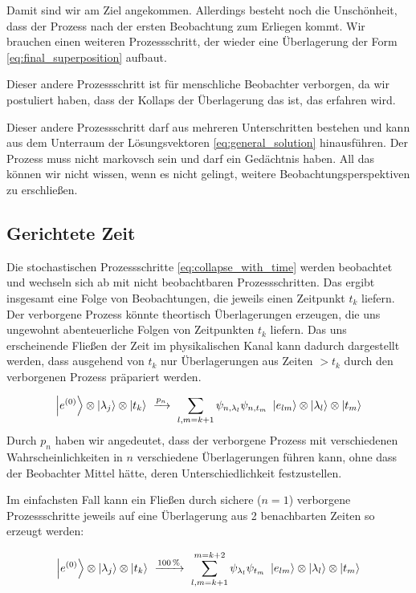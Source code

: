 \documentclass[12pt]{article}
\begin{document}
Damit sind wir am Ziel angekommen. Allerdings besteht noch die Unschönheit, dass der Prozess nach der ersten Beobachtung zum Erliegen kommt. Wir brauchen einen weiteren Prozessschritt, der wieder eine Überlagerung der Form \eqref{eq:final_superposition} aufbaut. 

Dieser andere Prozessschritt ist für menschliche Beobachter verborgen, da wir postuliert haben, dass der Kollaps der Überlagerung das ist, das erfahren wird. 

Dieser andere Prozessschritt darf aus mehreren Unterschritten bestehen und kann aus dem Unterraum der Lösungsvektoren \eqref{eq:general_solution} hinausführen. Der Prozess muss nicht markovsch sein und darf ein Gedächtnis haben. All das können wir nicht wissen, wenn es nicht gelingt, weitere Beobachtungsperspektiven zu erschließen. 

\subsection{Gerichtete Zeit}

Die stochastischen Prozessschritte \eqref{eq:collapse_with_time} werden beobachtet und wechseln sich ab mit nicht beobachtbaren Prozessschritten. Das ergibt insgesamt eine Folge von Beobachtungen, die jeweils einen Zeitpunkt $t_k$ liefern. Der verborgene Prozess könnte theortisch Überlagerungen erzeugen, die uns ungewohnt abenteuerliche Folgen von Zeitpunkten $t_k$ liefern. Das uns erscheinende Fließen der Zeit im physikalischen Kanal kann dadurch dargestellt werden, dass ausgehend von $t_k$ nur Überlagerungen aus Zeiten $> t_k$ durch den verborgenen Prozess präpariert werden.

\begin{equation} 
\label{eq:preparation_with_time}
\ket{e^{(0)}} \otimes \ket{\lambda_j} \otimes \ket{t_k}
\ \xrightarrow{p_{n}}\ 
\sum_{l,m=k+1} \psi_{n,\lambda_l}\psi_{n,t_m} \ \ket{e_{lm}} \otimes \ket{\lambda_l} \otimes \ket{t_m} 
\end{equation}
Durch $p_n$ haben wir angedeutet, dass der verborgene Prozess mit verschiedenen  Wahrscheinlichkeiten in $n$ verschiedene Überlagerungen führen kann, ohne dass der Beobachter Mittel hätte, deren Unterschiedlichkeit festzustellen.

Im einfachsten Fall kann ein Fließen durch sichere ($n=1$) verborgene Prozessschritte jeweils auf eine Überlagerung aus 2 benachbarten Zeiten so erzeugt werden:

\begin{equation*} 
\ket{e^{(0)}} \otimes \ket{\lambda_j} \otimes \ket{t_k}
\ \xrightarrow{100\,\%}\ 
\sum_{l,m=k+1}^{m=k+2} \psi_{\lambda_l}\psi_{t_m} \ \ket{e_{lm}} \otimes \ket{\lambda_l} \otimes \ket{t_m} 
\end{equation*}
\end{document}
